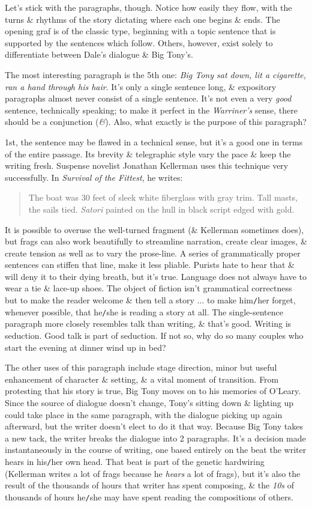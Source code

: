 \documentclass{article}
\numberwithin{equation}{section}
\begin{document}
Let's stick with the paragraphs, though. Notice how easily they flow, with the turns \& rhythms of the story dictating where each one begins \& ends. The opening graf is of the classic type, beginning with a topic sentence that is supported by the sentences which follow. Others, however, exist solely to differentiate between Dale's dialogue \& Big Tony's.

The most interesting paragraph is the 5th one: \textit{Big Tony sat down, lit a cigarette, ran a hand through his hair}. It's only a single sentence long, \& expository paragraphs almost never consist of a single sentence. It's not even a very \textit{good} sentence, technically speaking; to make it perfect in the \textit{Warriner's} sense, there should be a conjunction (\textit{\&}). Also, what exactly is the purpose of this paragraph?

1st, the sentence may be flawed in a technical sense, but it's a good one in terms of the entire passage. Its brevity \& telegraphic style vary the pace \& keep the writing fresh. Suspense novelist Jonathan Kellerman uses this technique very successfully. In \textit{Survival of the Fittest}, he writes:
\begin{quotation}
	The boat was 30 feet of sleek white fiberglass with gray trim. Tall masts, the sails tied. \textit{Satori} painted on the hull in black script edged with gold.
\end{quotation}
It is possible to overuse the well-turned fragment (\& Kellerman sometimes does), but frags can also work beautifully to streamline narration, create clear images, \& create tension as well as to vary the prose-line. A series of grammatically proper sentences can stiffen that line, make it less pliable. Purists hate to hear that \& will deny it to their dying breath, but it's true. Language does not always have to wear a tie \& lace-up shoes. The object of fiction isn't grammatical correctness but to make the reader welcome \& then tell a story $\ldots$ to make him{\tt/}her forget, whenever possible, that he{\tt/}she is reading a story at all. The single-sentence paragraph more closely resembles talk than writing, \& that's good. Writing is seduction. Good talk is part of seduction. If not so, why do so many couples who start the evening at dinner wind up in bed?

The other uses of this paragraph include stage direction, minor but useful enhancement of character \& setting, \& a vital moment of transition. From protesting that his story is true, Big Tony moves on to his memories of O'Leary. Since the source of dialogue doesn't change, Tony's sitting down \& lighting up could take place in the same paragraph, with the dialogue picking up again afterward, but the writer doesn't elect to do it that way. Because Big Tony takes a new tack, the writer breaks the dialogue into 2 paragraphs. It's a decision made instantaneously in the course of writing, one based entirely on the beat the writer hears in his{\tt/}her own head. That beat is part of the genetic hardwiring (Kellerman writes a lot of frags because he \textit{hears} a lot of frags), but it's also the result of the thousands of hours that writer has spent composing, \& the \textit{10s} of thousands of hours he{\tt/}she may have spent reading the compositions of others.
\end{document}
